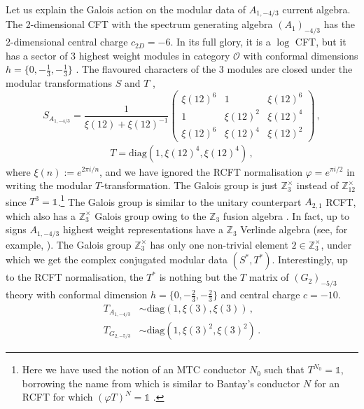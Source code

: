 \documentclass[a4paper,12pt]{article}
\begin{document}
Let us explain the Galois action on the modular data of $A_{1,-4/3}$ current algebra. The 2-dimensional CFT with the spectrum generating algebra $(A_1)_{-4/3}$ has the 2-dimensional central charge $c_{2D}=-6$. In its full glory, it is a $\log$ CFT, but it has a sector of 3 highest weight modules in category $\mathcal{O}$ with conformal dimensions $h=\{0,-\frac{1}{3},-\frac{1}{3}\}$ \cite{Creutzig:2012sd, Creutzig:2013hma, Creutzig:2013yca}. The flavoured characters of the 3 modules are closed under the modular transformations $S$ and $T$ \cite{Mathur:1988gt, Dedushenko:2018bpp},
%
\begin{equation}
    S_{A_{1,-4/3}}=\frac{1}{\xi(12)+\xi(12)^{-1}}\begin{pmatrix}
\xi(12)^6 & 1 &\xi(12)^6\\
1 & \xi(12)^2 & \xi(12)^4 \\
\xi(12)^6 & \xi(12)^4 & \xi(12)^2
\end{pmatrix}\, ,
\end{equation}
%
\begin{align}
    T=\mathrm{diag}(1,\xi(12)^4,\xi(12)^4)\, ,
\end{align}
%
where $\xi(n):=e^{2\pi i/n}$, and we have ignored the RCFT normalisation $\varphi=e^{\pi i/2}$ in writing the modular $T$-transformation. The Galois group is just $\mathbb{Z}_3^{\times}$ instead of $\mathbb{Z}_{12}^{\times}$ since $T^3=\mathbb{1}$.\footnote{Here we have used the notion of an MTC conductor $N_0$ such that $T^{N_0}=\mathbb{1}$, borrowing the name from \cite{Buican:2019evc} which is similar to Bantay's conductor $N$ for an RCFT for which $(\varphi T)^N=\mathbb{1}$ \cite{Bantay_2003}.} The Galois group is similar to the unitary counterpart $A_{2,1}$ RCFT, which also has a $\mathbb{Z}_3^{\times}$ Galois group owing to the $\mathbb{Z}_3$ fusion algebra \cite{Buican:2021axn}. In fact, up to signs $A_{1,-4/3}$ highest weight representations have a $\mathbb{Z}_3$ Verlinde algebra (see, for example, \cite{Buican:2019huq}). The Galois group $\mathbb{Z}_3^{\times}$ has only one non-trivial element $2\in\mathbb{Z}_3^\times$, under which we get the complex conjugated modular data $(S^*,T^*)$. Interestingly, up to the RCFT normalisation, the $T^*$ is nothing but the $T$ matrix of $(G_2)_{-5/3}$ theory with conformal dimension $h=\{0,-\frac{2}{3},-\frac{2}{3}\}$ and central charge $c=-10$.
%
\begin{align}
    T_{A_{1,-4/3}}&\sim\mathrm{diag}(1,\xi(3),\xi(3))\, ,\\
    T_{G_{2,-5/3}}&\sim\mathrm{diag}(1,\xi(3)^2,\xi(3)^2)\, .
\end{align}
%
\end{document}
